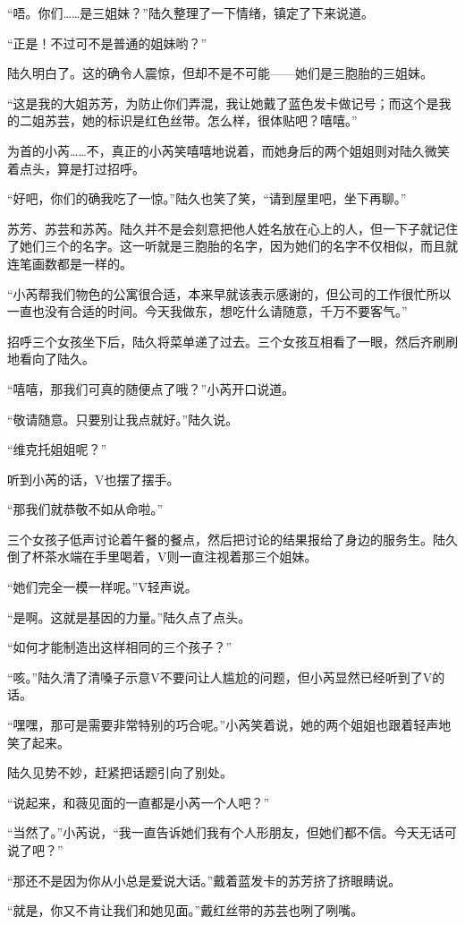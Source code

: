 “唔。你们……是三姐妹？”陆久整理了一下情绪，镇定了下来说道。

“正是！不过可不是普通的姐妹哟？”

陆久明白了。这的确令人震惊，但却不是不可能——她们是三胞胎的三姐妹。

“这是我的大姐苏芳，为防止你们弄混，我让她戴了蓝色发卡做记号；而这个是我的二姐苏芸，她的标识是红色丝带。怎么样，很体贴吧？嘻嘻。”

为首的小芮……不，真正的小芮笑嘻嘻地说着，而她身后的两个姐姐则对陆久微笑着点头，算是打过招呼。

“好吧，你们的确我吃了一惊。”陆久也笑了笑，“请到屋里吧，坐下再聊。”

苏芳、苏芸和苏芮。陆久并不是会刻意把他人姓名放在心上的人，但一下子就记住了她们三个的名字。这一听就是三胞胎的名字，因为她们的名字不仅相似，而且就连笔画数都是一样的。

“小芮帮我们物色的公寓很合适，本来早就该表示感谢的，但公司的工作很忙所以一直也没有合适的时间。今天我做东，想吃什么请随意，千万不要客气。”

招呼三个女孩坐下后，陆久将菜单递了过去。三个女孩互相看了一眼，然后齐刷刷地看向了陆久。

“嘻嘻，那我们可真的随便点了哦？”小芮开口说道。

“敬请随意。只要别让我点就好。”陆久说。

“维克托姐姐呢？”

听到小芮的话，V也摆了摆手。

“那我们就恭敬不如从命啦。”

三个女孩子低声讨论着午餐的餐点，然后把讨论的结果报给了身边的服务生。陆久倒了杯茶水端在手里喝着，V则一直注视着那三个姐妹。

“她们完全一模一样呢。”V轻声说。

“是啊。这就是基因的力量。”陆久点了点头。

“如何才能制造出这样相同的三个孩子？”

“咳。”陆久清了清嗓子示意V不要问让人尴尬的问题，但小芮显然已经听到了V的话。

“嘿嘿，那可是需要非常特别的巧合呢。”小芮笑着说，她的两个姐姐也跟着轻声地笑了起来。

陆久见势不妙，赶紧把话题引向了别处。

“说起来，和薇见面的一直都是小芮一个人吧？”

“当然了。”小芮说，“我一直告诉她们我有个人形朋友，但她们都不信。今天无话可说了吧？”

“那还不是因为你从小总是爱说大话。”戴着蓝发卡的苏芳挤了挤眼睛说。

“就是，你又不肯让我们和她见面。”戴红丝带的苏芸也咧了咧嘴。

